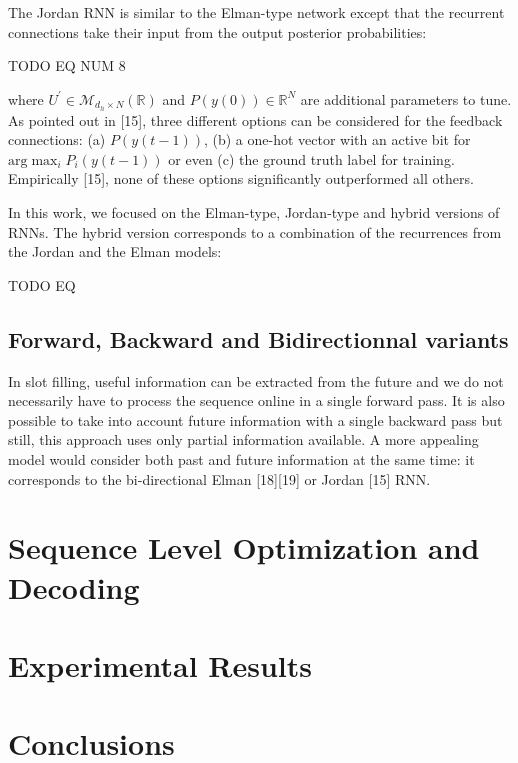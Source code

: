 The Jordan RNN is similar to the Elman-type network except that the recurrent
connections take their input from the output posterior probabilities:

TODO EQ NUM 8

where $U^{'}\in\mathcal{M}_{d_h\times N} (\mathbb{R})$ and
$Ρ(y(0))\in\mathbb{R}^N$ are additional parameters to tune. As pointed out in
[15], three different options can be considered for the feedback connections:
(a) $Ρ(y(t-1))$, (b) a one-hot vector with an active bit for $\textrm{arg} \max_i⁡P_i
(y(t-1))$ or even (c) the ground truth label for training.  Empirically [15],
none of these options significantly outperformed all others.  

In this work, we focused on the Elman-type, Jordan-type and hybrid versions of
RNNs. The hybrid version corresponds to a combination of the recurrences from
the Jordan and the Elman models:

TODO EQ

\subsection{Forward, Backward and Bidirectionnal variants}

In slot filling, useful information can be extracted from the future and we do
not necessarily have to process the sequence online in a single forward pass.
It is also possible to take into account future information with a single
backward pass but still, this approach uses only partial information available.
A more appealing model would consider both past and future information at the
same time: it corresponds to the bi-directional Elman [18][19] or Jordan [15]
RNN.




\section{Sequence Level Optimization and Decoding} \label{sec:slod}

\section{Experimental Results}
\label{sec:exp}

\section{Conclusions}
\label{sec:conclu}
